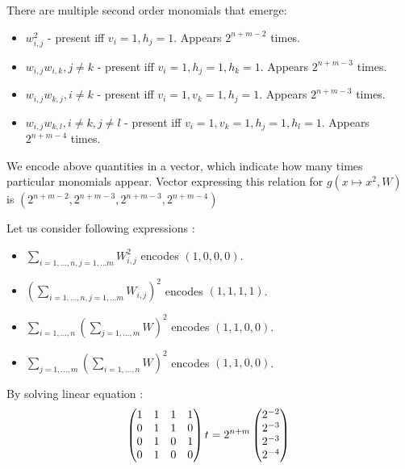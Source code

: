 \documentclass{article}
\begin{document}
There are multiple second order monomials that emerge: 

\begin{itemize}
	\item $w_{i,j}^2$ - present iff $v_i = 1, h_j = 1$. Appears $2^{n + m - 2}$ times.
	\item $w_{i,j} w_{i, k}, j \neq k$ - present iff $v_i = 1, h_j = 1, h_k = 1$. Appears $2^{n + m - 3}$ times.	
	\item $w_{i,j} w_{k, j}, i \neq k$ - present iff $v_i = 1, v_k = 1, h_j = 1$. Appears $2^{n + m - 3}$ times.
	\item $w_{i,j} w_{k, l}, i \neq k, j \neq l$ - present iff $v_i = 1, v_k = 1, h_j = 1, h_l = 1$. Appears $2^{n + m - 4}$ times.			
\end{itemize}
We encode above quantities in a vector, which indicate how many times particular monomials 
appear. Vector expressing this relation for $g(x \mapsto x^2, W)$ is $(2^{n + m - 2}, 2^{n + m - 3}, 2^{n + m - 3}, 2^{n + m - 4})$


Let us consider following expressions : 
\begin{itemize}
 \item $\sum_{i = 1, \dots, n, j = 1, \dots m} W_{i, j}^2$ encodes $(1, 0, 0, 0)$. 
 \item $(\sum_{i = 1, \dots, n, j = 1, \dots m} W_{i, j})^2$ encodes $(1, 1, 1, 1)$.
 \item $\sum_{i = 1, \dots, n}(\sum_{j = 1, \dots, m} W)^2$ encodes $(1, 1, 0, 0)$. 
 \item $\sum_{j = 1, \dots, m}(\sum_{i = 1, \dots, n} W)^2$ encodes $(1, 1, 0, 0)$. 
\end{itemize}
 
 By solving linear equation :
 \begin{equation}
 \begin{pmatrix} 
  1 & 1 & 1 & 1 \\ 
  0 & 1 & 1 & 0 \\ 
  0 & 1 & 0 & 1 \\ 
  0 & 1 & 0 & 0 \\     
\end{pmatrix}t = 2^{n + m}\begin{pmatrix} 
  2^{-2}\\ 
  2^{-3}\\ 
  2^{-3}\\ 
  2^{-4}\\     
\end{pmatrix} \\
 \end{equation}
\end{document}
